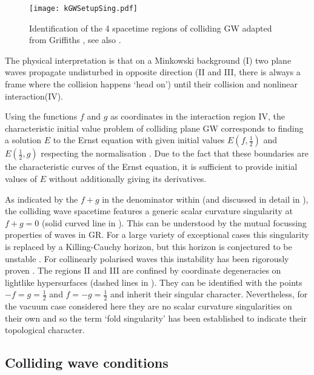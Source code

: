 \documentclass[12pt]{iopart}
\begin{document}
\begin{figure}[ht]
\centering
\texttt{[image: kGWSetupSing.pdf]}
\caption{Identification of the 4 spacetime regions of colliding GW adapted from Griffiths \cite{Griffiths1991}, see also \cite{Szekeres1972,Khan_Penrose1971}.}
\label{fig:regions}
\end{figure} 

The physical interpretation is that on a Minkowski background (I) two plane waves propagate undisturbed in opposite direction (II and III, there is always a frame where the collision happens `head on') until their collision and nonlinear interaction(IV).

 Using the functions $f$ and $g$ as coordinates in the interaction region IV, the characteristic initial value problem of colliding plane GW corresponds to finding a solution $E$ to the Ernst equation  with given initial values $E(f,\frac12)$ and $E(\frac12,g)$ respecting the normalisation . Due to the fact that these boundaries are the characteristic curves of the Ernst equation, it is sufficient to provide  initial values of $E$ without additionally giving its derivatives.

As indicated by the $f+g$ in the denominator within  (and discussed in detail in \cite{Griffiths1991}), the colliding wave spacetime features a generic scalar curvature singularity at $f+g=0$ (solid curved line in ). This can be understood by the mutual focussing properties of waves in GR. For a large variety of exceptional cases this singularity is replaced by a Killing-Cauchy horizon, but this horizon is conjectured to be unstable \cite{Yurtsever1989}. For collinearly polarised waves this instability has been rigorously proven \cite{Griffiths2005}. The regions II and III are confined by coordinate degeneracies on lightlike hypersurfaces (dashed lines in ). They can be identified with the points $-f=g=\frac12$ and $f=-g=\frac12$ and inherit their singular character. Nevertheless, for the vacuum case considered here they are no scalar curvature singularities on their own and so the term `fold singularity' has been established to indicate their topological character. 

\subsection{Colliding wave conditions}
\end{document}
